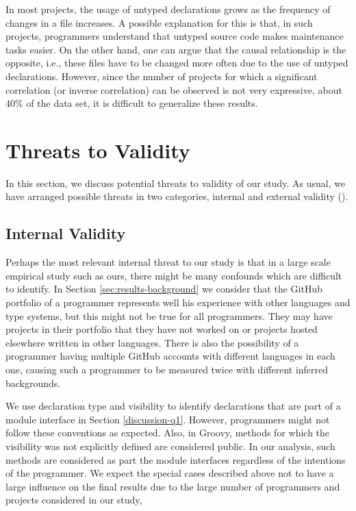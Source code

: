 \documentclass[msc]{ppgccufmg}
\begin{document}
In most projects, the usage of untyped declarations grows as the frequency of changes in a file increases.
A possible explanation for this is that, in such projects, programmers understand that untyped source code makes maintenance tasks easier.
On the other hand, one can argue that the causal relationship is the opposite, i.e., these files have to be changed more often due to the use of untyped declarations.
However, since the number of projects for which a significant correlation (or inverse correlation) can be observed is not very expressive, about 40\% of the data set, it is difficult to generalize these results.

\pagebreak 
\section{Threats to Validity\label{threats}}
In this section, we discuss potential threats to validity of our study. As usual, we have arranged possible threats in two categories, internal and external validity (\cite{Wohlin2012}). 

\subsection*{Internal Validity}
Perhaps the most relevant internal threat to our study is that in a large scale empirical study such as ours, there might be many confounds which are difficult to identify.
In Section \ref{sec:results-background} we consider that the GitHub portfolio of a programmer represents well his experience with other languages and type systems, but this might not be true for all programmers.
They may have projects in their portfolio that they have not worked on or projects hosted elsewhere written in other languages.
There is also the possibility of a programmer having multiple GitHub accounts with different languages in each one, causing such a programmer to be measured twice with different inferred backgrounds.


We use declaration type and visibility to identify declarations that are part of a module interface in Section \ref{discussion-q1}. 
However, programmers might not follow these conventions as expected.
Also, in Groovy, methods for which the visibility was not explicitly defined are considered public.
In our analysis, such methods are considered as part the module interfaces regardless of the intentions of the programmer.
We expect the special cases described above not to have a large influence on the final results due to the large number of programmers and projects considered in our study, 
\end{document}
